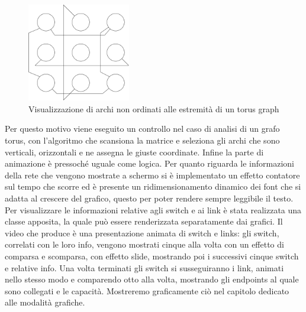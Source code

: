 \documentclass[binding=0.6cm]{sapthesis}
\begin{document}
\begin{figure}[h]
    \centering
    \includegraphics[width=0.4\textwidth]{immagini/archi_asimmetrici_torus.png}
    \caption{Visualizzazione di archi non ordinati alle estremità di un torus graph}
    \label{fig:torus_archi_asimmetrici}
\end{figure}

Per questo motivo viene eseguito un controllo nel caso di analisi di un grafo torus, con l'algoritmo che scansiona la matrice e seleziona gli 
archi che sono verticali, orizzontali
e ne assegna le giuste coordinate.
Infine la parte di animazione è pressoché uguale come logica.
Per quanto riguarda le informazioni della rete che vengono mostrate a schermo si è implementato un effetto contatore sul tempo che scorre ed è presente
un ridimensionamento dinamico dei font che si adatta al crescere del grafico, questo per poter rendere sempre leggibile il testo.
Per visualizzare le informazioni relative agli switch e ai link è stata realizzata una classe apposita, la quale può essere renderizzata separatamente dai grafici.
Il video che produce è una presentazione animata di switch e links: gli switch, correlati con le loro info, vengono mostrati cinque alla volta con un effetto di comparsa e scomparsa, con effetto slide, mostrando poi i successivi cinque switch e relative info.
Una volta terminati gli switch si susseguiranno i link, animati nello stesso modo e comparendo otto alla volta, mostrando gli endpoints al quale sono collegati e le capacità. Mostreremo graficamente ciò nel capitolo dedicato alle modalità grafiche.
\end{document}
